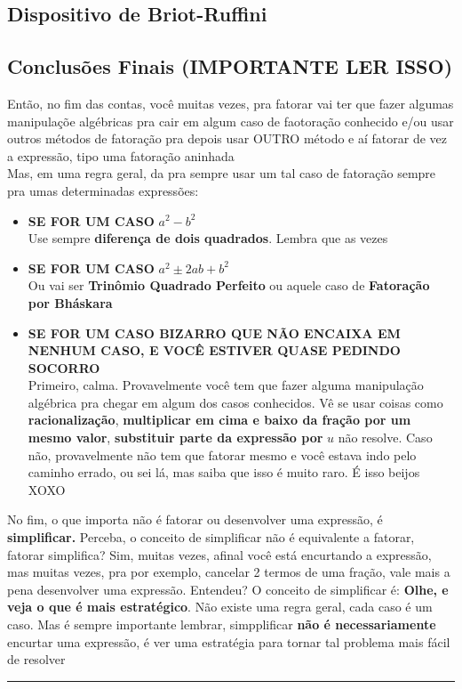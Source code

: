 \documentclass{article}
\begin{document}
\subsection{Dispositivo de Briot-Ruffini}

\subsection{Conclusões Finais (IMPORTANTE LER ISSO)}
Então, no fim das contas, você muitas vezes, pra fatorar vai ter que fazer algumas manipulaçõe algébricas pra cair em algum caso de faotoração conhecido e/ou usar outros métodos de fatoração pra depois usar OUTRO método e aí fatorar de vez a expressão, tipo uma fatoração aninhada
\\[5pt]
Mas, em uma regra geral, da pra sempre usar um tal caso de fatoração sempre pra umas determinadas expressões:
\begin{itemize}
    \item \textbf{SE FOR UM CASO} $a^2-b^2$ \\[5pt]
    Use sempre \textbf{diferença de dois quadrados}. Lembra que as vezes
    \item \textbf{SE FOR UM CASO} $a^2\pm 2ab+b^2$ \\[5pt]
    Ou vai ser \textbf{Trinômio Quadrado Perfeito} ou aquele caso de \textbf{Fatoração por Bháskara}
    \item \textbf{SE FOR UM CASO BIZARRO QUE NÃO ENCAIXA EM NENHUM CASO, E VOCÊ ESTIVER QUASE PEDINDO SOCORRO} \\[5pt]
    Primeiro, calma. Provavelmente você tem que fazer alguma manipulação algébrica pra chegar em algum dos casos conhecidos. Vê se usar coisas como \textbf{racionalização}, \textbf{multiplicar em cima e baixo da fração por um mesmo valor}, \textbf{substituir parte da expressão por} $u$ não resolve. Caso não, provavelmente não tem que fatorar mesmo e você estava indo pelo caminho errado, ou sei lá, mas saiba que isso é muito raro. É isso beijos XOXO
\end{itemize}
No fim, o que importa não é fatorar ou desenvolver uma expressão, é \textbf{simplificar.} Perceba, o conceito de simplificar não é equivalente a fatorar, fatorar simplifica? Sim, muitas vezes, afinal você está encurtando a expressão, mas muitas vezes, pra por exemplo, cancelar 2 termos de uma fração, vale mais a pena desenvolver uma expressão. Entendeu? O conceito de simplificar é: \textbf{Olhe, e veja o que é mais estratégico}. Não existe uma regra geral, cada caso é um caso. Mas é sempre importante lembrar, simpplificar \textbf{não é necessariamente} encurtar uma expressão, é ver uma estratégia para tornar tal problema mais fácil de resolver
\vspace{15pt}
\hrule
\vspace{15pt}
\end{document}
